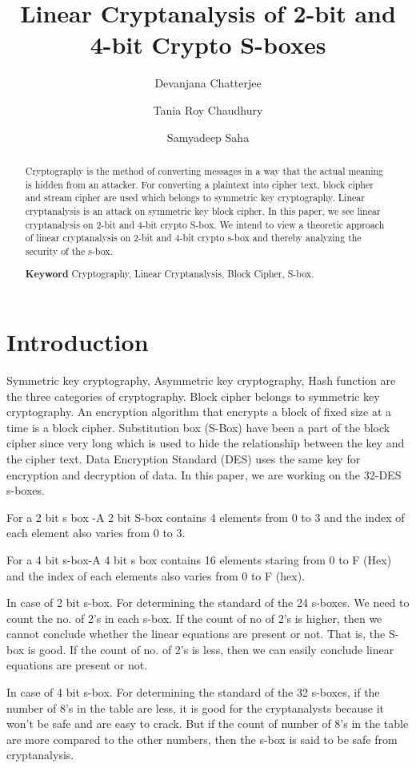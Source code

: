 \documentclass[12pt]{article}
\title{Linear Cryptanalysis of 2-bit and 4-bit Crypto S-boxes}
\author[1]{Devanjana Chatterjee}
\author[2]{Tania Roy Chaudhury}
\author[3]{Samyadeep Saha}
\affil{Surendranath College, University of Calcutta}
\begin{document}
\begin{abstract}
Cryptography is the method of converting messages in a way that the actual meaning is hidden from an attacker. For converting a plaintext into cipher text, block cipher and stream cipher are used which belongs to symmetric key cryptography. Linear cryptanalysis is an attack on symmetric key block cipher. In this paper, we see linear cryptanalysis on 2-bit and 4-bit crypto S-box. We intend to view a theoretic approach of linear cryptanalysis on 2-bit and 4-bit crypto s-box and thereby analyzing the security of the s-box.

\textbf{Keyword} Cryptography, Linear Cryptanalysis, Block Cipher, S-box.
\end{abstract}
\section{Introduction}
Symmetric key cryptography, Asymmetric key cryptography, Hash function are the three categories of cryptography. Block cipher belongs to symmetric key cryptography. An encryption algorithm that encrypts a block of fixed size at a time is a block cipher. Substitution box (S-Box) have been a part of the block cipher since very long which is used to hide the relationship between the key and the cipher text. Data Encryption Standard (DES) uses the same key for encryption and decryption of data. In this paper, we are working on the 32-DES s-boxes. 

For a 2 bit s box -A 2 bit S-box contains 4 elements from 0 to 3 and the index of each element also varies from 0 to 3. 

For a 4 bit s-box-A 4 bit s box contains 16 elements staring from 0 to F (Hex) and the index of each elements also varies from 0 to F (hex). 

In case of 2 bit s-box. For determining the standard of the 24 s-boxes. We need to count the no. of 2’s in each s-box. If the count of no of 2’s is higher, then we cannot conclude whether the linear equations are present or not. That is, the S- box is good. If the count of no. of 2’s is less, then we can easily conclude linear equations are present or not. 

In case of 4 bit s-box. For determining the standard of the 32 s-boxes, if the number of 8’s in the table are less, it is good for the cryptanalysts because it won’t be safe and are easy to crack. But if the count of number of 8’s in the table are more compared to the other numbers, then the s-box is said to be safe from cryptanalysis.
\end{document}
